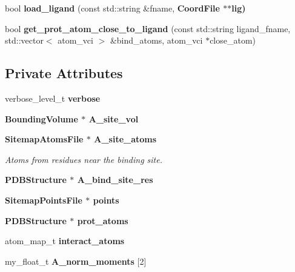 \begin{CompactItemize}
\item 
bool \textbf{load\_\-ligand} (const std::string \&fname, \bf{Coord\-File} $\ast$$\ast$lig)\label{classSimSite3D_1_1Sitemap_4c1be8761d14961907869cd902292581}

\item 
bool \textbf{get\_\-prot\_\-atom\_\-close\_\-to\_\-ligand} (const std::string ligand\_\-fname, std::vector$<$ atom\_\-vci $>$ \&bind\_\-atoms, atom\_\-vci $\ast$close\_\-atom)\label{classSimSite3D_1_1Sitemap_d896226d048c6c0f9347bee48b938f86}

\end{CompactItemize}
\subsection*{Private Attributes}
\begin{CompactItemize}
\item 
verbose\_\-level\_\-t \textbf{verbose}\label{classSimSite3D_1_1Sitemap_b030f50473b6d8670e571d51003f424d}

\item 
\bf{Bounding\-Volume} $\ast$ \textbf{A\_\-site\_\-vol}\label{classSimSite3D_1_1Sitemap_6990d012cf2b73d02b1a953df6bea5b9}

\item 
\bf{Sitemap\-Atoms\-File} $\ast$ \bf{A\_\-site\_\-atoms}\label{classSimSite3D_1_1Sitemap_aacf141914798bdd7861687e432628f8}

\begin{CompactList}\small\item\em Atoms from residues near the binding site. \item\end{CompactList}\item 
\bf{PDBStructure} $\ast$ \textbf{A\_\-bind\_\-site\_\-res}\label{classSimSite3D_1_1Sitemap_2a52e689037b97d6a36e93507c7883ea}

\item 
\bf{Sitemap\-Points\-File} $\ast$ \textbf{points}\label{classSimSite3D_1_1Sitemap_0d487acfbafbcd354984bc9ee12d4f18}

\item 
\bf{PDBStructure} $\ast$ \textbf{prot\_\-atoms}\label{classSimSite3D_1_1Sitemap_d14802c86d41cb3aebbad567ab57cde0}

\item 
atom\_\-map\_\-t \textbf{interact\_\-atoms}\label{classSimSite3D_1_1Sitemap_104c9c8b0dc2d1c8239e24ff9ae16d30}

\item 
my\_\-float\_\-t \textbf{A\_\-norm\_\-moments} [2]\label{classSimSite3D_1_1Sitemap_3b31d195203a3e0b86a9b4e42f29aefe}


\end{CompactItemize}
